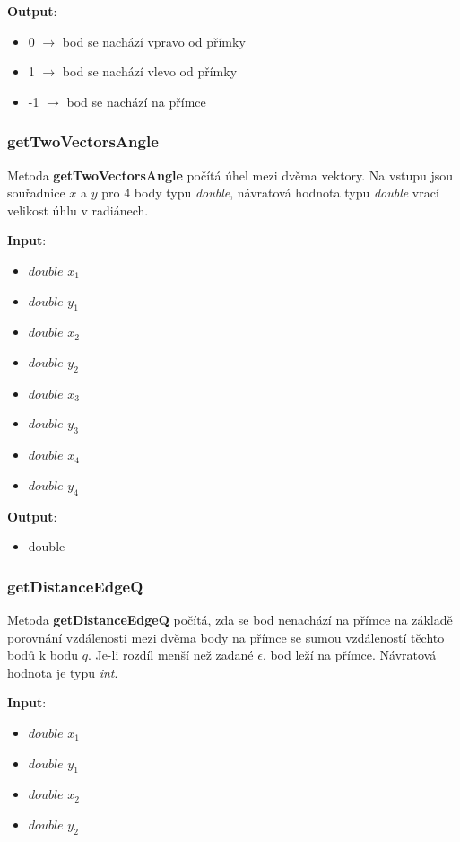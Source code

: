 \documentclass[a4paper, 12pt]{article}
\begin{document}
\textbf{Output}:
\begin{itemize}
\item 0 $\rightarrow$ bod se nachází vpravo od přímky
\item 1 $\rightarrow$ bod se nachází vlevo od přímky
\item -1 $\rightarrow$ bod se nachází na přímce
\end{itemize}

\subsubsection{getTwoVectorsAngle}
Metoda \textbf{getTwoVectorsAngle} počítá úhel mezi dvěma vektory. Na vstupu jsou souřadnice $x$ a $y$ pro 4 body typu \textit{double}, návratová hodnota typu \textit{double} vrací velikost úhlu v radiánech.

\textbf{Input}:
\begin{itemize}
\item $double$ $x_1$
\item $double$ $y_1$
\item $double$ $x_2$
\item $double$ $y_2$
\item $double$ $x_3$
\item $double$ $y_3$
\item $double$ $x_4$
\item $double$ $y_4$
\end{itemize}

\textbf{Output}:
\begin{itemize}
\item double 
\end{itemize}

\subsubsection{getDistanceEdgeQ}
Metoda \textbf{getDistanceEdgeQ} počítá, zda se bod nenachází na přímce na základě porovnání vzdálenosti mezi dvěma body na přímce se sumou vzdáleností těchto bodů k bodu $q$. Je-li rozdíl menší než zadané $\epsilon$, bod leží na přímce. Návratová hodnota je typu \textsl{int}.

\textbf{Input}:
\begin{itemize}
\item $double$ $x_1$
\item $double$ $y_1$
\item $double$ $x_2$
\item $double$ $y_2$	
\end{itemize}
\end{document}
